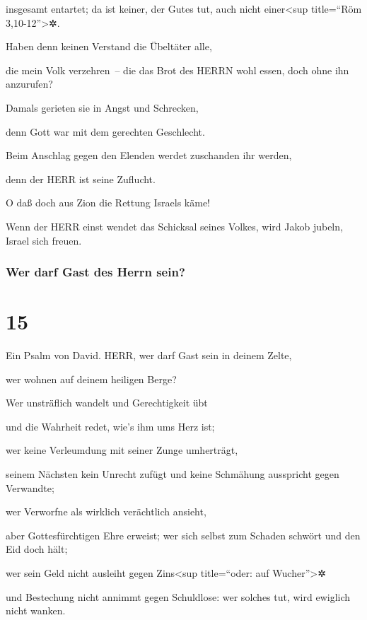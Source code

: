 insgesamt entartet; da ist keiner, der Gutes tut, auch nicht
einer\textless sup title=``Röm 3,10-12''\textgreater✲.

Haben denn keinen Verstand die Übeltäter alle,

die mein Volk verzehren~-- die das Brot des HERRN wohl essen, doch ohne
ihn anzurufen?

Damals gerieten sie in Angst und Schrecken,

denn Gott war mit dem gerechten Geschlecht.

Beim Anschlag gegen den Elenden werdet zuschanden ihr
werden,

denn der HERR ist seine Zuflucht.

O daß doch aus Zion die Rettung Israels käme!

Wenn der HERR einst wendet das Schicksal seines Volkes, wird Jakob
jubeln, Israel sich freuen.

\hypertarget{wer-darf-gast-des-herrn-sein}{%
\subsubsection{Wer darf Gast des Herrn
sein?}\label{wer-darf-gast-des-herrn-sein}}

\hypertarget{section-14}{%
\section{15}\label{section-14}}

Ein Psalm von David. HERR, wer darf Gast sein in deinem
Zelte,

wer wohnen auf deinem heiligen Berge?

Wer unsträflich wandelt und Gerechtigkeit übt

und die Wahrheit redet, wie's ihm ums Herz ist;

wer keine Verleumdung mit seiner Zunge umherträgt,

seinem Nächsten kein Unrecht zufügt und keine Schmähung ausspricht gegen
Verwandte;

wer Verworfne als wirklich verächtlich ansieht,

aber Gottesfürchtigen Ehre erweist; wer sich selbst zum Schaden schwört
und den Eid doch hält;

wer sein Geld nicht ausleiht gegen Zins\textless sup
title=``oder: auf Wucher''\textgreater✲

und Bestechung nicht annimmt gegen Schuldlose: wer solches tut, wird
ewiglich nicht wanken.

